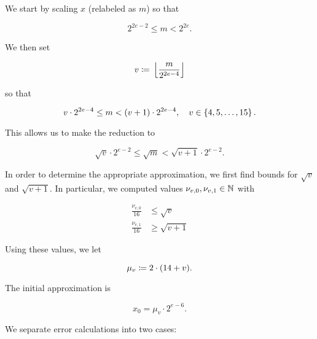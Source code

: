 We start by scaling $x$ (relabeled as $m$) so that

\begin{equation}
    2^{2e-2} \le m < 2^{2e}.
\end{equation}

\noindent
We then set

\begin{equation}
    v \coloneqq{} \left\lfloor \frac{m}{2^{2e-4}} \right\rfloor
\end{equation}

\noindent
so that

\begin{equation}
    v\cdot2^{2e-4} \le m < \left( v+1 \right)\cdot2^{2e-4},
    \quad v\in\left\{ 4, 5, \dots, 15 \right\}.
\end{equation}

\noindent
This allows us to make the reduction to

\begin{equation}
    \sqrt{v}\cdot2^{e-2} \le \sqrt{m} < \sqrt{v+1}\cdot2^{e-2}.
    \label{eq:app_linear_m_bound}
\end{equation}

In order to determine the appropriate approximation,
we first find bounds for $\sqrt{v}$ and $\sqrt{v+1}$.
In particular, we computed values $\nu_{v,0}, \nu_{v,1}\in\mathbb{N}$ with

\begin{align}
    \frac{\nu_{v,0}}{16} &\le \sqrt{v} \nonumber\\
    \frac{\nu_{v,1}}{16} &\ge \sqrt{v+1}
    \label{eq:app_linear_v_bound}
\end{align}

\noindent
Using these values,
we let

\begin{equation}
    \mu_{v} \coloneqq{} 2\cdot(14 + v).
\end{equation}

The initial approximation is

\begin{equation}
    x_{0} = \mu_{v}\cdot2^{e-6}.
\end{equation}

\noindent
We separate error calculations into two cases:

